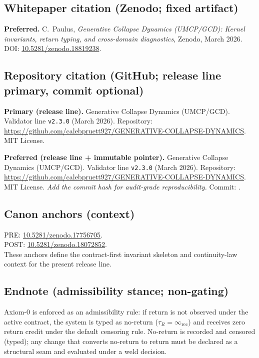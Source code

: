 \documentclass[
  aps,
  prd,
  preprint,
  superscriptaddress,
  nofootinbib,
  floatfix
]{revtex4-2}
\newcommand{\Rinf}{\infty_{\mathrm{rec}}}
\newcommand{\typed}[1]{\texttt{#1}}
\newcommand{\PaperDOI}{10.5281/zenodo.18819238}
\newcommand{\ReleaseMonth}{March 2026}
\newcommand{\CanonPRE}{10.5281/zenodo.17756705}
\newcommand{\CanonPOST}{10.5281/zenodo.18072852}
\newcommand{\RepoURL}{https://github.com/calebpruett927/GENERATIVE-COLLAPSE-DYNAMICS}
\newcommand{\RepoRelease}{v2.3.0}
\newcommand{\RepoCommit}{}
\begin{document}
\subsection*{Whitepaper citation (Zenodo; fixed artifact)}
\noindent\textbf{Preferred.}
C.~Paulus, \emph{Generative Collapse Dynamics
(UMCP/GCD): Kernel invariants, return typing, and
cross-domain diagnostics},
Zenodo, \ReleaseMonth.
DOI: \href{https://doi.org/\PaperDOI}{\PaperDOI}.

\subsection*{Repository citation (GitHub; release line primary, commit optional)}
\noindent\textbf{Primary (release line).}
Generative Collapse Dynamics (UMCP/GCD).
Validator line \typed{\RepoRelease}
(\ReleaseMonth). Repository:\\
\url{\RepoURL}. MIT License.

\medskip
\noindent\textbf{Preferred (release line + immutable pointer).}
Generative Collapse Dynamics (UMCP/GCD).
Validator line \typed{\RepoRelease}
(\ReleaseMonth). Repository:\\
\url{\RepoURL}. MIT License.
\ifx\RepoCommit\empty\relax
\emph{Add the commit hash for audit-grade reproducibility.}
\else
Commit: \texttt{\RepoCommit}.
\fi

\subsection*{Canon anchors (context)}
\noindent
PRE: \href{https://doi.org/\CanonPRE}{\CanonPRE}.\\[2pt]
POST: \href{https://doi.org/\CanonPOST}{\CanonPOST}.\\[2pt]
These anchors define the contract-first invariant skeleton
and continuity-law context for the present release line.

\subsection*{Endnote (admissibility stance; non-gating)}
\noindent Axiom-0 is enforced as an admissibility rule: if return is not observed under the active contract, the system is typed as
no-return ($\tau_R=\Rinf$) and receives zero return credit under the default censoring rule.
No-return is recorded and censored (typed); any change that converts no-return to return must be declared as a structural seam and
evaluated under a weld decision.
\end{document}
